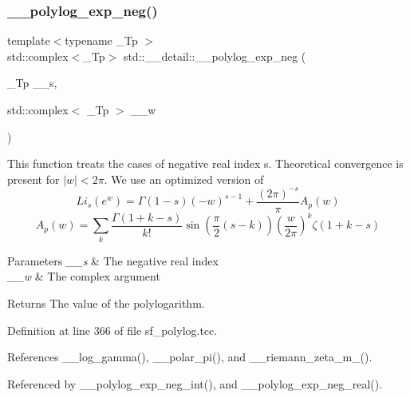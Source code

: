 \mbox{\label{namespacestd_1_1____detail_a07b26b8c7ff467310e4e1df6e3efd893}} 
\subsubsection{\texorpdfstring{\+\_\+\+\_\+polylog\+\_\+exp\+\_\+neg()}{\_\_polylog\_exp\_neg()}\hspace{0.1cm}{\footnotesize\ttfamily [1/2]}}
{\footnotesize\ttfamily template$<$typename \+\_\+\+Tp $>$ \\
std\+::complex$<$\+\_\+\+Tp$>$ std\+::\+\_\+\+\_\+detail\+::\+\_\+\+\_\+polylog\+\_\+exp\+\_\+neg (\begin{DoxyParamCaption}\item[{\+\_\+\+Tp}]{\+\_\+\+\_\+s,  }\item[{std\+::complex$<$ \+\_\+\+Tp $>$}]{\+\_\+\+\_\+w }\end{DoxyParamCaption})}

This function treats the cases of negative real index s. Theoretical convergence is present for $ |w| < 2\pi $. We use an optimized version of \[ Li_s(e^w) = \Gamma(1-s)(-w)^{s-1} + \frac{(2\pi)^{-s}}{\pi} A_p(w) \] \[ A_p(w) = \sum_k \frac{\Gamma(1+k-s)}{k!} \sin\left(\frac{\pi}{2} (s-k)\right) \left(\frac{w}{2\pi}\right)^k \zeta(1+k-s) \] 
\begin{DoxyParams}{Parameters}
{\em \+\_\+\+\_\+s} & The negative real index \\
\hline
{\em \+\_\+\+\_\+w} & The complex argument \\
\hline
\end{DoxyParams}
\begin{DoxyReturn}{Returns}
The value of the polylogarithm. 
\end{DoxyReturn}


Definition at line 366 of file sf\+\_\+polylog.\+tcc.



References \+\_\+\+\_\+log\+\_\+gamma(), \+\_\+\+\_\+polar\+\_\+pi(), and \+\_\+\+\_\+riemann\+\_\+zeta\+\_\+m\+\_().



Referenced by \+\_\+\+\_\+polylog\+\_\+exp\+\_\+neg\+\_\+int(), and \+\_\+\+\_\+polylog\+\_\+exp\+\_\+neg\+\_\+real().

